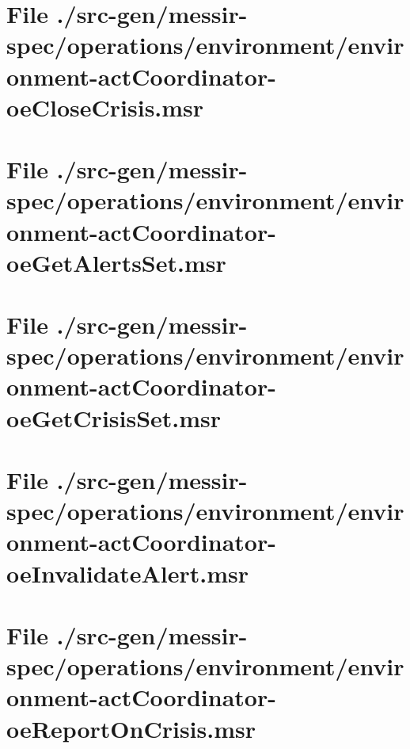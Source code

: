\section[File /src-gen/messir-spec.../environment-actCoordinator-oeCloseCrisis.msr]{File ./src-gen/messir-spec/operations/environment/environment-actCoordinator-oeCloseCrisis.msr}
\scriptsize

\normalsize
	
\section[File /src-gen/messir-spec.../environment-actCoordinator-oeGetAlertsSet.msr]{File ./src-gen/messir-spec/operations/environment/environment-actCoordinator-oeGetAlertsSet.msr}
\scriptsize

\normalsize
	
\section[File /src-gen/messir-spec.../environment-actCoordinator-oeGetCrisisSet.msr]{File ./src-gen/messir-spec/operations/environment/environment-actCoordinator-oeGetCrisisSet.msr}
\scriptsize

\normalsize
	
\section[File /src-gen/messir-spec.../environment-actCoordinator-oeInvalidateAlert.msr]{File ./src-gen/messir-spec/operations/environment/environment-actCoordinator-oeInvalidateAlert.msr}
\scriptsize

\normalsize
	
\section[File /src-gen/messir-spec.../environment-actCoordinator-oeReportOnCrisis.msr]{File ./src-gen/messir-spec/operations/environment/environment-actCoordinator-oeReportOnCrisis.msr}
\scriptsize

\normalsize
	
